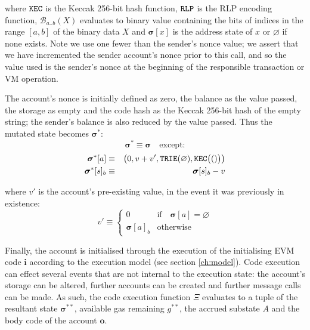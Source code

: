 \documentclass[9pt,oneside]{amsart}
\begin{document}
\begin{multicols}{2}
where $\mathtt{\tiny KEC}$ is the Keccak 256-bit hash function, $\mathtt{\tiny RLP}$ is the RLP encoding function, $\mathcal{B}_{a..b}(X)$ evaluates to binary value containing the bits of indices in the range $[a, b]$ of the binary data $X$ and $\boldsymbol{\sigma}[x]$ is the address state of $x$ or $\varnothing$ if none exists. Note we use one fewer than the sender's nonce value; we assert that we have incremented the sender account's nonce prior to this call, and so the value used is the sender's nonce at the beginning of the responsible transaction or VM operation.

The account's nonce is initially defined as zero, the balance as the value passed, the storage as empty and the code hash as the Keccak 256-bit hash of the empty string; the sender's balance is also reduced by the value passed. Thus the mutated state becomes $\boldsymbol{\sigma}^*$:
\begin{equation}
\boldsymbol{\sigma}^* \equiv \boldsymbol{\sigma} \quad \text{except:}
\end{equation}
\begin{eqnarray}
\boldsymbol{\sigma}^*[a] &\equiv& \big( 0, v + v', \mathtt{\tiny TRIE}(\varnothing), \mathtt{\tiny KEC}\big(()\big) \big) \\
\boldsymbol{\sigma}^*[s]_b &\equiv& \boldsymbol{\sigma}[s]_b - v
\end{eqnarray}

where $v'$ is the account's pre-existing value, in the event it was previously in existence:
\begin{equation}
v' \equiv \begin{cases}
0 & \text{if} \quad \boldsymbol{\sigma}[a] = \varnothing\\
\boldsymbol{\sigma}[a]_b & \text{otherwise}
\end{cases}
\end{equation}


Finally, the account is initialised through the execution of the initialising EVM code $\mathbf{i}$ according to the execution model (see section \ref{ch:model}). Code execution can effect several events that are not internal to the execution state: the account's storage can be altered, further accounts can be created and further message calls can be made. As such, the code execution function $\Xi$ evaluates to a tuple of the resultant state $\boldsymbol{\sigma}^{**}$, available gas remaining $g^{**}$, the accrued substate $A$ and the body code of the account $\mathbf{o}$.


\end{multicols}
\end{document}
